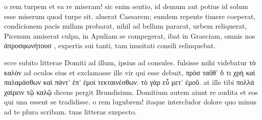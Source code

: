 


 o rem turpem et ea re miseram! sic enim sentio, id demum aut potius id solum esse miserum quod turpe sit. aluerat Caesarem; eundem repente timere coeperat, condicionem pacis nullam probarat, nihil ad bellum pararat, urbem reliquerat, Picenum amiserat culpa, in Apuliam se compegerat, ibat in Graeciam, omnis nos ἀπροσφωνήτουσ , expertis sui tanti, tam inusitati consili relinquebat.

 ecce subito litterae Domiti ad illum, ipsius ad consules. fulsisse mihi videbatur τὸ καλὸν ad oculos eius et exclamasse ille vir qui esse debuit, πρὸσ ταῦθ' ὅ τι χρὴ καὶ παλαμάσθων καὶ πάντ' ἐπ' ἐμοὶ τεκταινέσθων: τὸ γὰρ εὖ μετ' ἐμοῦ. at ille tibi πολλὰ χαίρειν τῷ καλῷ dicens pergit Brundisium. Domitium autem aiunt re audita et eos qui una essent se tradidisse. o rem lugubrem! itaque intercludor dolore quo minus ad te plura scribam. tuas litteras exspecto.
